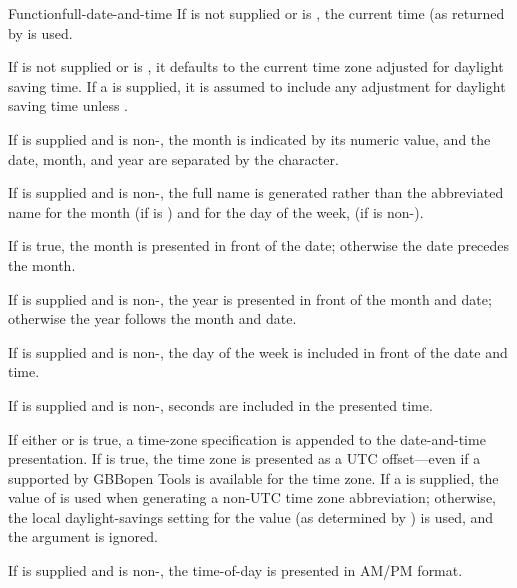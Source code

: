 \documentclass[10pt,twoside,english,pdftex]{article}
\begin{document}
\begin{functiondoc}{Function}{full-date-and-time}
\W{} 
%
%
If  is not supplied or is \nil, the current time
(as returned by  is used.

\W{} 
%
If  is not supplied or is \nil, it defaults to the current
time zone adjusted for daylight saving time. If a  is
supplied, it is assumed to include any adjustment for daylight saving time
unless .

\W{} 
%
If  is supplied and is non-\nil, the month is indicated by
its numeric value, and the date, month, and year are separated by the
 character.

\W{} 
%
If  is supplied and is non-\nil, the full name is generated
rather than the abbreviated name for the month (if  is
\nil) and for the day of the week, (if  is non-\nil).

\W{} 
%
If  is true, the month is presented in front of the
date; otherwise the date precedes the month.

\W{} 
%
If  is supplied and is non-\nil, the year is presented in
front of the month and date; otherwise the year follows the month and date.

\W{} 
%
If  is supplied and is non-\nil, the day of the week is
included in front of the date and time.

\W{} 
%
If  is supplied and is non-\nil, seconds are included
in the presented time.

\W{} 
%
If either  or  is true,
a time-zone specification is appended to the date-and-time presentation.  If
 is true, the time zone is presented as a UTC
offset---even if a  supported by
GBBopen Tools is available for the time zone.  If a 
is supplied, the value of  is used when
generating a non-UTC time zone abbreviation; otherwise, the local
daylight-savings setting for the  value (as
determined by ) is used, and the
 argument is ignored.

\W{} 
%
If  is supplied and is non-\nil, the time-of-day is presented
in AM/PM format.


\end{functiondoc}
\end{document}
